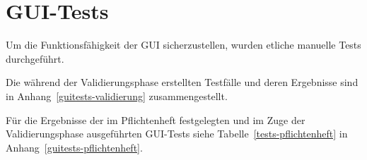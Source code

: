 \section{GUI-Tests}

Um die Funktionsfähigkeit der GUI sicherzustellen, wurden etliche manuelle Tests durchgeführt.

Die während der Validierungsphase erstellten Testfälle und deren Ergebnisse sind in Anhang~\ref{guitests-validierung} zusammengestellt.

Für die Ergebnisse der im Pflichtenheft festgelegten und im Zuge der Validierungsphase ausgeführten GUI-Tests siehe Tabelle~\ref{tests-pflichtenheft} in Anhang~\ref{guitests-pflichtenheft}.